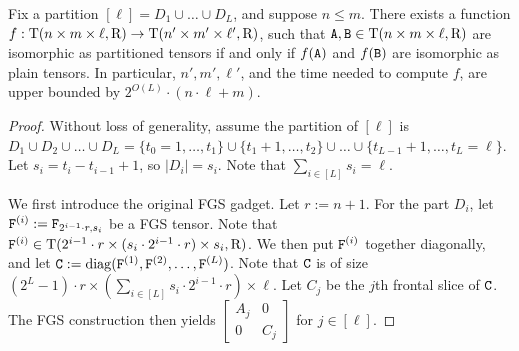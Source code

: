 \begin{theorem}\label{thm:pTI-TI}
	Fix a partition $[\ell]=D_1\cup \dots \cup D_L$, and suppose $n\leq m$. There exists a function $f:\mathrm{T}(n\times m\times\ell, \mathrm{R})\to\mathrm{T}(n'\times m'\times \ell', \mathrm{R})$, such that $\mathtt{A}, \mathtt{B}\in\mathrm{T}(n\times m\times \ell, \mathrm{R})$ are isomorphic as partitioned tensors if and only if $f(\mathtt{A})$ and $f(\mathtt{B})$ are isomorphic as plain tensors. In particular, $n', m', \ell'$, and the time needed to compute $f$, are upper bounded by $2^{O(L)}\cdot (n\cdot \ell+m)$.
\end{theorem}
\begin{proof}
Without loss of generality, assume the partition of $[\ell]$ is $D_1\cup D_2\cup \dots \cup D_L=\{t_0=1, \dots, t_1\}\cup \{t_1+1, \dots, t_2\}\cup \dots \cup\{t_{L-1}+1, \dots, t_L=\ell\}$. Let $s_i=t_i-t_{i-1}+1$, so $|D_i|=s_i$. Note that $\sum_{i\in[L]}s_i=\ell$.

We first introduce the original FGS gadget. Let $r:=n+1$. For the part $D_i$, let $\mathtt{F}^{(i)}:=\mathtt{F}_{2^{i-1}\cdot r, s_i}$ be a FGS tensor. Note that $\mathtt{F}^{(i)}\in\mathrm{T}(2^{i-1}\cdot r\times (s_i\cdot 2^{i-1}\cdot r)\times s_i, \mathrm{R})$. We then put $\mathtt{F}^{(i)}$ together diagonally, and let $\mathtt{C}:=\operatorname{diag}(\mathtt{F}^{(1)}, \mathtt{F}^{(2)}, \dots, \mathtt{F}^{(L)})$. Note that $\mathtt{C}$ is of size $(2^L-1)\cdot r \times (\sum_{i\in[L]}s_i\cdot 2^{i-1}\cdot r)\times \ell$. Let $C_j$ be the $j$th frontal slice of $\mathtt{C}$. The FGS construction then yields $\begin{bmatrix}
	A_j & 0 \\
	0 & C_j
	\end{bmatrix}$ for $j\in[\ell]$.

%


\end{proof}
